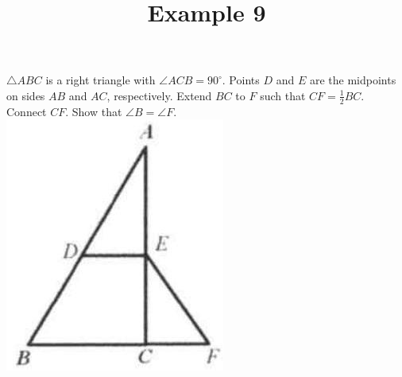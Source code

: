 \documentclass{article}
\title{Example 9}
\date{}
\begin{document}
\maketitle

\(\triangle A B C\) is a right triangle with \(\angle A C B=90^{\circ}\). Points \(D\) and \(E\) are the midpoints on sides \(A B\) and \(A C\), respectively. Extend \(B C\) to \(F\) such that \(C F=\frac{1}{2} B C\). Connect \(C F\). Show that \(\angle B=\angle F\).\\
\centering
\includegraphics[width=\textwidth]{images/problem_image_1.jpg}
\end{document}
